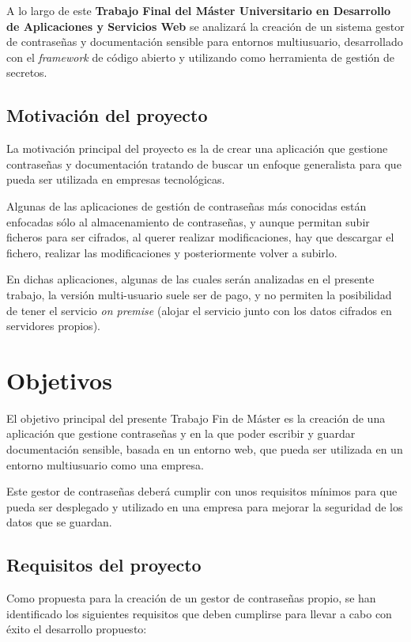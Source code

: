 \documentclass{\ClassPath/viu-tfm-template}
\begin{document}
A lo largo de este \textbf{Trabajo Final del Máster Universitario en Desarrollo de Aplicaciones y Servicios Web} se analizará la creación de un sistema gestor de contraseñas y documentación sensible para entornos multiusuario, desarrollado con el \textit{framework} de código abierto  \textcite{angular} y utilizando \textcite{vault} como herramienta de gestión de secretos.

\section{Motivación del proyecto}

La motivación principal del proyecto es la de crear una aplicación que gestione contraseñas y documentación tratando de buscar un enfoque generalista para que pueda ser utilizada en empresas tecnológicas.

Algunas de las aplicaciones de gestión de contraseñas más conocidas están enfocadas sólo al almacenamiento de contraseñas, y aunque permitan subir ficheros para ser cifrados, al querer realizar modificaciones, hay que descargar el fichero, realizar las modificaciones y posteriormente volver a subirlo.

En dichas aplicaciones, algunas de las cuales serán analizadas en el presente trabajo, la versión multi-usuario suele ser de pago, y no permiten la posibilidad de tener el servicio \textit{on premise} (alojar el servicio junto con los datos cifrados en servidores propios).



\chapter{Objetivos}

El objetivo principal del presente Trabajo Fin de Máster es la creación de una aplicación que gestione contraseñas y en la que poder escribir y guardar documentación sensible, basada en un entorno web, que pueda ser utilizada en un entorno multiusuario como una empresa.



Este gestor de contraseñas deberá cumplir con unos requisitos mínimos para que pueda ser desplegado y utilizado en una empresa para mejorar la seguridad de los datos que se guardan.

\hypertarget{requisitos}{}
\section{Requisitos del proyecto}
Como propuesta para la creación de un gestor de contraseñas propio, se han identificado los siguientes requisitos que deben cumplirse para llevar a cabo con éxito el desarrollo propuesto:
\end{document}
